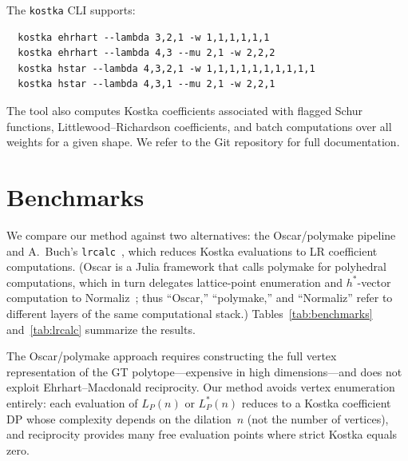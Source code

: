 \documentclass[11pt,reqno]{amsart}
\theoremstyle{definition}
\newcommand{\Ehr}{L}
\newcommand{\Ehrstar}{L^{*}}
\begin{document}
The \texttt{kostka} CLI supports:
\begin{verbatim}
  kostka ehrhart --lambda 3,2,1 -w 1,1,1,1,1,1
  kostka ehrhart --lambda 4,3 --mu 2,1 -w 2,2,2
  kostka hstar --lambda 4,3,2,1 -w 1,1,1,1,1,1,1,1,1,1
  kostka hstar --lambda 4,3,1 --mu 2,1 -w 2,2,1
\end{verbatim}
The tool also computes Kostka coefficients associated with flagged
Schur functions, Littlewood--Richardson coefficients, and batch
computations over all weights for a given shape.  We refer to the
Git repository for full documentation.


\section{Benchmarks}\label{sec:benchmarks}

We compare our method against two alternatives:
the Oscar/polymake pipeline~\cite{GawrilowJoswig2000,OskarThesis}
and A.~Buch's \texttt{lrcalc}~\cite{Buch2000}, which reduces Kostka
evaluations to LR coefficient computations.
(Oscar is a Julia framework that calls polymake for polyhedral
computations, which in turn delegates lattice-point enumeration
and $h^*$-vector computation to Normaliz~\cite{BrunsIchim2010};
thus ``Oscar,'' ``polymake,'' and ``Normaliz'' refer to different
layers of the same computational stack.)
Tables~\ref{tab:benchmarks} and~\ref{tab:lrcalc} summarize the results.

The Oscar/polymake approach requires constructing the full vertex
representation of the GT polytope---expensive in high dimensions---and
does not exploit Ehrhart--Macdonald reciprocity.  Our method avoids
vertex enumeration entirely: each evaluation of $\Ehr_P(n)$ or
$\Ehrstar_P(n)$ reduces to a Kostka coefficient DP whose complexity
depends on the dilation~$n$ (not the number of vertices), and
reciprocity provides many free evaluation points where strict Kostka
equals zero.
\end{document}
